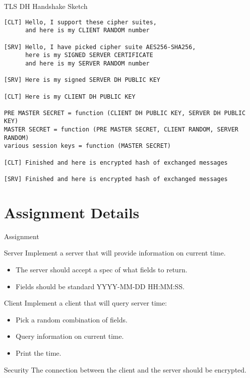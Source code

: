 \begin{frame}[fragile]{TLS DH Handshake Sketch}
\begin{lstlisting}[style=mini]
[CLT] Hello, I support these cipher suites,
      and here is my CLIENT RANDOM number

[SRV] Hello, I have picked cipher suite AES256-SHA256,
      here is my SIGNED SERVER CERTIFICATE
      and here is my SERVER RANDOM number

[SRV] Here is my signed SERVER DH PUBLIC KEY

[CLT] Here is my CLIENT DH PUBLIC KEY

PRE MASTER SECRET = function (CLIENT DH PUBLIC KEY, SERVER DH PUBLIC KEY)
MASTER SECRET = function (PRE MASTER SECRET, CLIENT RANDOM, SERVER RANDOM)
various session keys = function (MASTER SECRET)

[CLT] Finished and here is encrypted hash of exchanged messages

[SRV] Finished and here is encrypted hash of exchanged messages
\end{lstlisting}
\end{frame}


\section{Assignment Details}


\begin{frame}{Assignment}
    \begin{block}{Server}
        Implement a server that will provide information on current time.
        \begin{itemize}
            \item The server should accept a spec of what fields to return.
            \item Fields should be standard YYYY-MM-DD HH:MM:SS.
        \end{itemize}
    \end{block}

    \begin{block}{Client}
        Implement a client that will query server time:
        \begin{itemize}
            \item Pick a random combination of fields.
            \item Query information on current time.
            \item Print the time.
        \end{itemize}
    \end{block}

    \begin{block}{Security}
        The connection between the client and the server should be encrypted.
    \end{block}
\end{frame}


